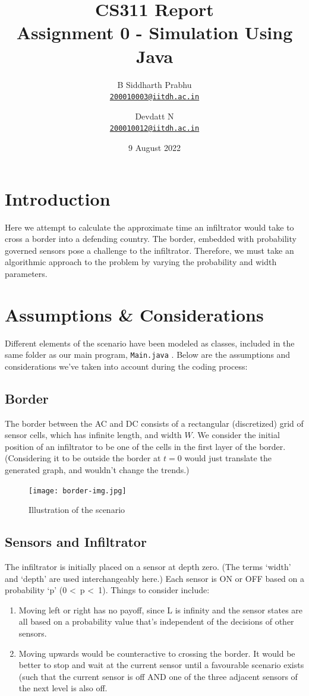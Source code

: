 \documentclass{article}
\title{\textbf{
CS311 Report \\ 
Assignment 0 - Simulation Using Java
}}
\author{
  B Siddharth Prabhu\\
  \href{mailto:200010003@iitdh.ac.in}{\texttt{200010003@iitdh.ac.in}}
  \and
  Devdatt N\\
  \href{mailto:200010012@iitdh.ac.in}{\texttt{200010012@iitdh.ac.in}}
  }
\date{9 August 2022}
\let\oldtexttt\texttt
\renewcommand{\texttt}[1]{
  \colorbox{bgcolor}{\oldtexttt{#1}}
  }
\begin{document}
\maketitle

\section{Introduction}
Here we attempt to calculate the approximate time an infiltrator would take to cross a border into a defending country. The border, embedded with probability governed sensors pose a challenge to the infiltrator. Therefore, we must take an algorithmic approach to the problem by varying the probability and width parameters. 

\section{Assumptions \& Considerations}
Different elements of the scenario have been modeled as classes, included in the same folder as our main program, \texttt{Main.java}. Below are the assumptions and considerations we've taken into account during the coding process:

\subsection{Border}
The border between the AC and DC consists of a rectangular (discretized) grid of sensor cells, which has infinite length, and width $W$. We consider the initial position of an infiltrator to be one of the cells in the first layer of the border. (Considering it to be outside the border at $t=0$ would just translate the generated graph, and wouldn't change the trends.)

\begin{figure}[hbt]
    \centering
    \texttt{[image: border-img.jpg]}
    \caption{Illustration of the scenario}
    \label{fig:border-img}
\end{figure}

\subsection{Sensors and Infiltrator}
The infiltrator is initially placed on a sensor at depth zero. (The terms `width' and `depth' are used interchangeably here.) Each sensor is ON or OFF based on a probability `p' (0 \textless~p \textless~1).
Things to consider include:
\begin{enumerate}
    \item Moving left or right has no payoff, since L is infinity and the sensor states are all based on a probability value that's independent of the decisions of other sensors.
    \item Moving upwards would be counteractive to crossing the border. It would be better to stop and wait at the current sensor until a favourable scenario exists (such that the current sensor is off AND one of the three adjacent sensors of the next level is also off.
\end{enumerate}
\end{document}
